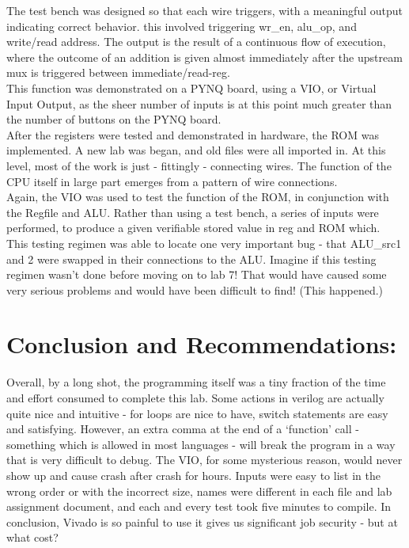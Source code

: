 \documentclass[12pt,a4paper]{article}
\begin{document}
The test bench was designed so that each wire triggers, with a meaningful
output indicating correct behavior. this involved triggering wr\_en,
alu\_op, and write/read address. The output is the result of a continuous
flow of execution, where the outcome of an addition is given almost
immediately after the upstream mux is triggered between immediate/read-reg. \\

This function was demonstrated on a PYNQ board, using a VIO, or Virtual Input
Output, as the sheer number of inputs is at this point much greater than the
number of buttons on the PYNQ board. \\

After the registers were tested and demonstrated in hardware, the ROM was
implemented. A new lab was began, and old files were all imported in. At this
level, most of the work is just - fittingly - connecting wires. The function
of the CPU itself in large part emerges from a pattern of wire connections. \\

Again, the VIO was used to test the function of the ROM, in conjunction with
the Regfile and ALU. Rather than using a test bench, a series of inputs were
performed, to produce a given verifiable stored value in reg and ROM which. \\

This testing regimen was able to locate one very important bug - that ALU\_src1
and 2 were swapped in their connections to the ALU. Imagine if this testing
regimen wasn't done before moving on to lab 7! That would have caused some very
serious problems and would have been difficult to find! (This happened.)

\section*{Conclusion and Recommendations:}

Overall, by a long shot, the programming itself was a tiny fraction of the
time and effort consumed to complete this lab. Some actions in verilog are
actually quite nice and intuitive - for loops are nice to have, switch
statements are easy and satisfying. However, an extra comma at the end of a
`function' call - something which is allowed in most languages - will break
the program in a way that is very difficult to debug. The VIO, for some
mysterious reason, would never show up and cause crash after crash for hours.
Inputs were easy to list in the wrong order or with the incorrect size,
names were different in each file and lab assignment document, and each and
every test took five minutes to compile. In conclusion, Vivado is so painful
to use it gives us significant job security - but at what cost? \\
\end{document}
